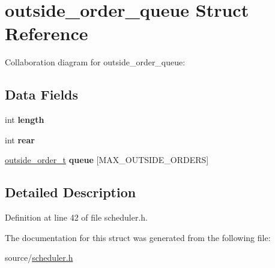 \hypertarget{structoutside__order__queue}{}\section{outside\+\_\+order\+\_\+queue Struct Reference}
\label{structoutside__order__queue}


Collaboration diagram for outside\+\_\+order\+\_\+queue\+:
\subsection*{Data Fields}
\begin{DoxyCompactItemize}
\item 
int {\bfseries length}\hypertarget{structoutside__order__queue_a8259fe8daf9f79a1acb9523b5750bd77}{}\label{structoutside__order__queue_a8259fe8daf9f79a1acb9523b5750bd77}

\item 
int {\bfseries rear}\hypertarget{structoutside__order__queue_af5116728b6d122a7b020ed4bd1a32f1b}{}\label{structoutside__order__queue_af5116728b6d122a7b020ed4bd1a32f1b}

\item 
\hyperlink{structoutside__order}{outside\+\_\+order\+\_\+t} {\bfseries queue} \mbox{[}M\+A\+X\+\_\+\+O\+U\+T\+S\+I\+D\+E\+\_\+\+O\+R\+D\+E\+RS\mbox{]}\hypertarget{structoutside__order__queue_a42fc224e7f768fb3b882628d8c052ca4}{}\label{structoutside__order__queue_a42fc224e7f768fb3b882628d8c052ca4}

\end{DoxyCompactItemize}


\subsection{Detailed Description}


Definition at line 42 of file scheduler.\+h.



The documentation for this struct was generated from the following file\+:\begin{DoxyCompactItemize}
\item 
source/\hyperlink{scheduler_8h}{scheduler.\+h}\end{DoxyCompactItemize}
